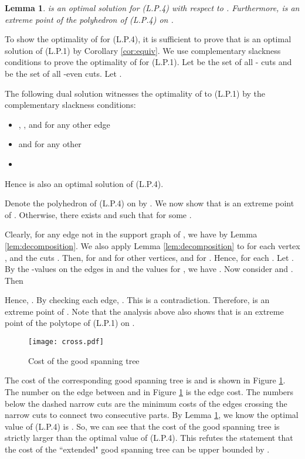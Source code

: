 \documentclass[11pt]{article}
\newcommand{\qed}{\hspace*{\fill}}
\newtheorem{lemma}[theorem]{Lemma}
\newenvironment{proof}[1][Proof. ]{\noindent {\bf #1 }}{\qed}
\begin{document}
\begin{lemma}\label{lem:feaExtreme}
 is an optimal solution for (L.P.4) with respect to .
Furthermore,  is an extreme point of the polyhedron of (L.P.4) on .
\end{lemma}
\begin{proof}
To show the optimality of  for (L.P.4), it is sufficient to prove that  is an optimal
solution of (L.P.1) by Corollary \ref{cor:equiv}. We use complementary slackness conditions to prove the optimality of  for (L.P.1).
Let  be the set of all - cuts and  be the set of all -even cuts. Let .



The following dual solution  witnesses the optimality of  to (L.P.1) by the complementary slackness conditions:
\begin{itemize}
\item , , and  for any other edge 
\item  and  for any other 
\item 
\end{itemize}
Hence  is also an optimal solution of (L.P.4).

Denote the polyhedron of (L.P.4) on  by . We now show that  is an extreme point of . Otherwise,
there exists  and  such that  for some
.

Clearly, for any edge  not in the support graph of , we have  by Lemma \ref{lem:decomposition}.
We also
apply Lemma \ref{lem:decomposition} to  for each vertex , and the cuts .
Then,  for  and  for other vertices, and  for .
Hence,  for each . Let . By the -values on the edges in  and the values  for , we have .
Now consider  and . Then

Hence, . By checking each edge, . This is a contradiction. Therefore,  is an extreme point of . Note that
the analysis above also shows that  is an extreme point of the polytope of (L.P.1) on .

\end{proof}


\begin{figure}[h]
\begin{center}
\texttt{[image: cross.pdf]}\\
  \caption{Cost of the good spanning tree}
  \label{COGST}
\end{center}
\end{figure}

The cost of the corresponding good spanning tree is  and is shown in Figure \ref{COGST}.
The number on the edge between  and  in Figure \ref{COGST} is the edge cost.
The numbers below the dashed narrow cuts are the minimum costs of the edges crossing the
 narrow cuts to connect two consecutive parts. By Lemma \ref{lem:feaExtreme}, we know the optimal value of (L.P.4) is .
 So, we can see that the cost of the good spanning tree
 is strictly larger than the optimal value of (L.P.4). This refutes the statement that the cost of the ``extended"
good spanning tree can be upper bounded by .
\end{document}
